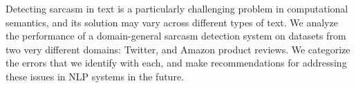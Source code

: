 Detecting sarcasm in text is a particularly challenging problem in computational semantics, and its solution may vary across different types of text.  We analyze the performance of a domain-general sarcasm detection system on datasets from two very different domains: Twitter, and Amazon product reviews.  We categorize the errors that we identify with each, and make recommendations for addressing these issues in NLP systems in the future.
